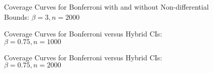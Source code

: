 \begin{figure}
  \centering
  
  \caption{Coverage Curves for Bonferroni with and without Non-differential Bounds: $\beta = 3, n = 2000$}
\end{figure}
%  
%
%  
%
%  
%
%  
%
%  
%
%  
%
\begin{figure}
  \centering
  
  \caption{Coverage Curves for Bonferroni versus Hybrid CIs: $\beta = 0.75, n = 1000$}
\end{figure}

\begin{figure}
  \centering
  
  \caption{Coverage Curves for Bonferroni versus Hybrid CIs: $\beta = 0.75, n = 2000$}
\end{figure}

